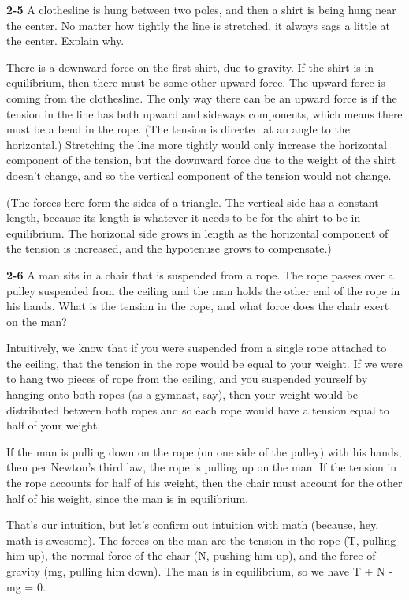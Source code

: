 \documentclass{amsart}
\begin{document}
\vspace{\baselineskip}

\noindent
\textbf{2-5} A clothesline is hung between two poles, and then a shirt is being hung near the center.
No matter how tightly the line is stretched, it always sags a little at the center.
Explain why.

There is a downward force on the first shirt, due to gravity.
If the shirt is in equilibrium, then there must be some other upward force.
The upward force is coming from the clothesline.
The only way there can be an upward force is if the tension in the line has both upward and sideways components,
which means there must be a bend in the rope.  (The tension is directed at an angle to the horizontal.)
Stretching the line more tightly would only increase the horizontal component of the tension,
but the downward force due to the weight of the shirt doesn't change,
and so the vertical component of the tension would not change.

(The forces here form the sides of a triangle.
The vertical side has a constant length,
because its length is whatever it needs to be for the shirt to be in equilibrium.
The horizonal side grows in length as the horizontal component of the tension is increased,
and the hypotenuse grows to compensate.)

\vspace{\baselineskip}

\noindent
\textbf{2-6} A man sits in a chair that is suspended from a rope.
The rope passes over a pulley suspended from the ceiling and the man holds the other end
of the rope in his hands.
What is the tension in the rope, and what force does the chair exert on the man?

Intuitively, we know that if you were suspended from a single rope attached to the ceiling,
that the tension in the rope would be equal to your weight.
If we were to hang two pieces of rope from the ceiling, and you suspended yourself by
hanging onto both ropes (as a gymnast, say), then your weight would be distributed between
both ropes and so each rope would have a tension equal to half of your weight.

If the man is pulling down on the rope (on one side of the pulley) with his hands,
then per Newton's third law, the rope is pulling up on the man.
If the tension in the rope accounts for half of his weight,
then the chair must account for the other half of his weight, since the man is in equilibrium.

That's our intuition, but let's confirm out intuition with math (because, hey, math is awesome).
The forces on the man are the tension in the rope (T, pulling him up), the normal force of the chair
(N, pushing him up), and the force of gravity (mg, pulling him down).
The man is in equilibrium, so we have T + N - mg = 0.
\end{document}
